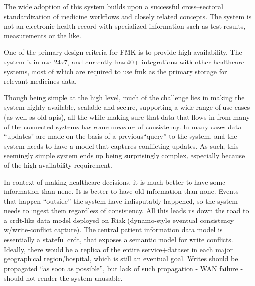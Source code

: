 \documentclass[11pt,a4paper]{report}
\begin{document}
The wide adoption of this system builds upon a successful cross--sectoral standardization of medicine workflows and closely related concepts. The system is not an electronic health record with specialized information such as test results, measurements or the like.

One of the primary design criteria for FMK is to provide high availability. The system is in use 24x7, and currently has 40+ integrations with other healthcare systems, most of which are required to use \gls{fmk} as the primary storage for relevant medicines data.

Though being simple at the high level, much of the challenge lies in making the system highly available, scalable and secure, supporting a wide range of use cases (as well as old \glspl{api}), all the while making sure that data that flows in from many of the connected systems has some measure of consistency. In many cases data ``updates'' are made on the basis of a previous``query'' to the system, and the system needs to have a model that captures conflicting updates. As such, this seemingly simple system ends up being surprisingly complex, especially because of the high availability requirement.

In context of making healthcare decisions, it is much better to have some information than none. It is better to have old information than none. Events that happen ``outside'' the system have indisputably happened, so the system needs to ingest them regardless of consistency.
All this leads us down the road to a \gls{crdt}-like data model deployed on Riak (dynamo-style eventual consistency w/write-conflict capture). The central patient information data model is essentially a stateful \gls{crdt}, that exposes a semantic model for write conflicts. Ideally, there would be a replica of the entire service+dataset in each major geographical region/hospital, which is still an eventual goal. Writes should be propagated ``as soon as possible'', but lack of such propagation - WAN failure - should not render the system unusable.
\end{document}
